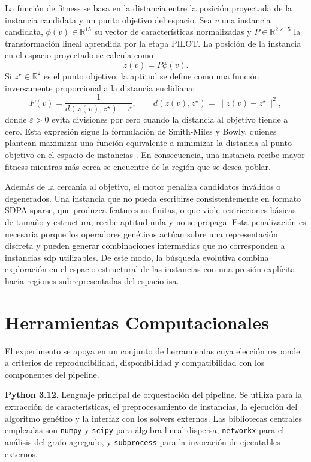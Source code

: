 La función de fitness se basa en la distancia entre la posición proyectada de la instancia candidata y un punto objetivo del espacio. Sea $v$ una
instancia candidata, $\phi(v)\in\mathbb{R}^{15}$ su vector de características normalizadas y $P\in\mathbb{R}^{2\times 15}$ la transformación lineal
aprendida por la etapa PILOT. La posición de la instancia en el espacio proyectado se calcula como
\[
    z(v)=P\phi(v).
\]
Si $z^\star\in\mathbb{R}^{2}$ es el punto objetivo, la aptitud se define como una función inversamente proporcional a la distancia euclidiana:
\[
    F(v)=\frac{1}{d(z(v),z^\star)+\varepsilon},
    \qquad
    d(z(v),z^\star)=\|z(v)-z^\star\|^2,
\]
donde $\varepsilon>0$ evita divisiones por cero cuando la distancia al objetivo tiende a cero. Esta expresión sigue la formulación de Smith-Miles y
Bowly, quienes plantean maximizar una función equivalente a minimizar la distancia al punto objetivo en el espacio de instancias
\cite{smith-milesGeneratingNewTest2015}. En consecuencia, una instancia recibe mayor fitness mientras más cerca se encuentre de la región que se
desea poblar.

Además de la cercanía al objetivo, el motor penaliza candidatos inválidos o degenerados. Una instancia que no pueda escribirse consistentemente en
formato SDPA sparse, que produzca features no finitas, o que viole restricciones básicas de tamaño y estructura, recibe aptitud nula y no se
propaga. Esta penalización es necesaria porque los operadores genéticos actúan sobre una representación discreta y pueden generar combinaciones
intermedias que no corresponden a instancias \acrshort{sdp} utilizables. De este modo, la búsqueda evolutiva combina exploración en el espacio
estructural de las instancias con una presión explícita hacia regiones subrepresentadas del espacio \acrshort{isa}.


\section{Herramientas Computacionales}
\label{sec:herramientas}

El experimento se apoya en un conjunto de herramientas cuya elección responde a criterios de reproducibilidad,
disponibilidad y compatibilidad con los componentes del pipeline.

\textbf{Python 3.12}. Lenguaje principal de orquestación del pipeline. Se utiliza para la extracción de características,
el preprocesamiento de instancias, la ejecución del algoritmo genético y la interfaz con los solvers externos. Las
bibliotecas centrales empleadas son \texttt{numpy} y \texttt{scipy} para álgebra lineal dispersa, \texttt{networkx}
para el análisis del grafo agregado, y \texttt{subprocess} para la invocación de ejecutables externos.

